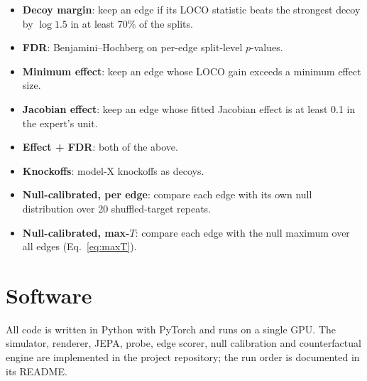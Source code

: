 \documentclass[11pt, a4paper, oneside,enumerate,textcomp]{report}
\begin{document}
\begin{itemize}
	\item \textbf{Decoy margin}: keep an edge if its LOCO statistic beats the strongest decoy by $\log 1.5$ in at least 70\% of the splits.
	\item \textbf{FDR}: Benjamini--Hochberg \cite{benjamini1995fdr} on per-edge split-level $p$-values.
	\item \textbf{Minimum effect}: keep an edge whose LOCO gain exceeds a minimum effect size.
	\item \textbf{Jacobian effect}: keep an edge whose fitted Jacobian effect is at least 0.1 in the expert's unit.
	\item \textbf{Effect + FDR}: both of the above.
	\item \textbf{Knockoffs}: model-X knockoffs \cite{candes2018panning} as decoys.
	\item \textbf{Null-calibrated, per edge}: compare each edge with its own null distribution over 20 shuffled-target repeats.
	\item \textbf{Null-calibrated, max-$T$}: compare each edge with the null maximum over all edges (Eq.~\ref{eq:maxT}).
\end{itemize}

\section{Software}

All code is written in Python with PyTorch and runs on a single GPU. The simulator, renderer, JEPA, probe, edge scorer, null calibration and counterfactual engine are implemented in the project repository; the run order is documented in its README.

\end{document}
